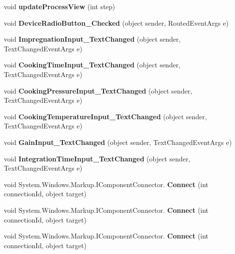 \begin{DoxyCompactItemize}
void {\bfseries update\+Process\+View} (int step)
\item 
\mbox{\label{class_a_s_e6030_1_1_main_window_aece2fb1ce86f6eadf27e6baf704e5004}} 
void {\bfseries Device\+Radio\+Button\+\_\+\+Checked} (object sender, Routed\+Event\+Args e)
\item 
\mbox{\label{class_a_s_e6030_1_1_main_window_a630c8264730869e95be667655adaa6e7}} 
void {\bfseries Impregnation\+Input\+\_\+\+Text\+Changed} (object sender, Text\+Changed\+Event\+Args e)
\item 
\mbox{\label{class_a_s_e6030_1_1_main_window_acb3d901ff9cac3d38aeb40c2aa3eae85}} 
void {\bfseries Cooking\+Time\+Input\+\_\+\+Text\+Changed} (object sender, Text\+Changed\+Event\+Args e)
\item 
\mbox{\label{class_a_s_e6030_1_1_main_window_a51d086539ee4b9a50a935a62227152d4}} 
void {\bfseries Cooking\+Pressure\+Input\+\_\+\+Text\+Changed} (object sender, Text\+Changed\+Event\+Args e)
\item 
\mbox{\label{class_a_s_e6030_1_1_main_window_aa72c9d337436f936081b639aede4d3a3}} 
void {\bfseries Cooking\+Temperature\+Input\+\_\+\+Text\+Changed} (object sender, Text\+Changed\+Event\+Args e)
\item 
\mbox{\label{class_a_s_e6030_1_1_main_window_a093699eefeec90be0b6776cf1cff57ec}} 
void {\bfseries Gain\+Input\+\_\+\+Text\+Changed} (object sender, Text\+Changed\+Event\+Args e)
\item 
\mbox{\label{class_a_s_e6030_1_1_main_window_a2553ee8521aa0a3776706b93fe5bc711}} 
void {\bfseries Integration\+Time\+Input\+\_\+\+Text\+Changed} (object sender, Text\+Changed\+Event\+Args e)
\item 
\mbox{\label{class_a_s_e6030_1_1_main_window_a5296565cd53cda08d5f39b8903961bee}} 
void System.\+Windows.\+Markup.\+I\+Component\+Connector. {\bfseries Connect} (int connection\+Id, object target)
\item 
\mbox{\label{class_a_s_e6030_1_1_main_window_a5296565cd53cda08d5f39b8903961bee}} 
void System.\+Windows.\+Markup.\+I\+Component\+Connector. {\bfseries Connect} (int connection\+Id, object target)
\item 
\mbox{\label{class_a_s_e6030_1_1_main_window_a5296565cd53cda08d5f39b8903961bee}} 
void System.\+Windows.\+Markup.\+I\+Component\+Connector. {\bfseries Connect} (int connection\+Id, object target)
\end{DoxyCompactItemize}
